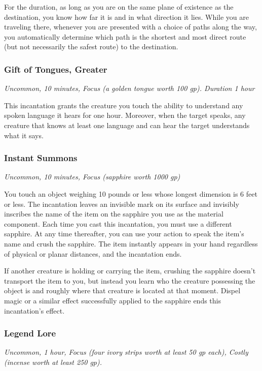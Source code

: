 For the duration, as long as you are on the same plane of existence as the destination, you know how far it is and in what direction it lies. While you are traveling there, whenever you are presented with a choice of paths along the way, you automatically determine which path is the shortest and most direct route (but not necessarily the safest route) to the destination.

\subsubsection{Gift of Tongues, Greater}
\textit{Uncommon, 10 minutes, Focus (a golden tongue worth 100 gp). Duration 1 hour}

This incantation grants the creature you touch the ability to understand any spoken language it hears for one hour. Moreover, when the target speaks, any creature that knows at least one language and can hear the target understands what it says.

\subsubsection{Instant Summons}
\textit{Uncommon, 10 minutes, Focus (sapphire worth 1000 gp)}

You touch an object weighing 10 pounds or less whose longest dimension is 6 feet or less. The incantation leaves an invisible mark on its surface and invisibly inscribes the name of the item on the sapphire you use as the material component. Each time you cast this incantation, you must use a different sapphire. At any time thereafter, you can use your action to speak the item's name and crush the sapphire. The item instantly appears in your hand regardless of physical or planar distances, and the incantation ends.

If another creature is holding or carrying the item, crushing the sapphire doesn't transport the item to you, but instead you learn who the creature possessing the object is and roughly where that creature is located at that moment. Dispel magic or a similar effect successfully applied to the sapphire ends this incantation's effect.

\subsubsection{Legend Lore}
\textit{Uncommon, 1 hour, Focus (four ivory strips worth at least 50 gp each), Costly (incense worth at least 250 gp).}


